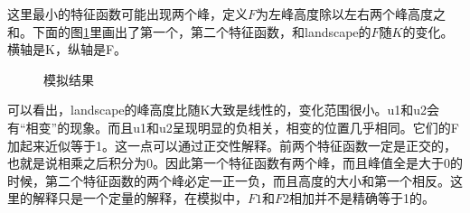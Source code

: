 \documentclass[12pt,a4paper]{article}
\begin{document}
这里最小的特征函数可能出现两个峰，定义$F$为左峰高度除以左右两个峰高度之和。下面的图\ref{f4}里画出了第一个，第二个特征函数，和landscape的$F$随$K$的变化。横轴是K，纵轴是F。
\begin{figure}[h]
\centering
{}
\caption{模拟结果}
\label{f4}
\end{figure}

可以看出，landscape的峰高度比随K大致是线性的，变化范围很小。u1和u2会有“相变”的现象。而且u1和u2呈现明显的负相关，相变的位置几乎相同。它们的F加起来近似等于1。这一点可以通过正交性解释。前两个特征函数一定是正交的，也就是说相乘之后积分为0。因此第一个特征函数有两个峰，而且峰值全是大于0的时候，第二个特征函数的两个峰必定一正一负，而且高度的大小和第一个相反。这里的解释只是一个定量的解释，在模拟中，$F1$和$F2$相加并不是精确等于1的。
\end{document}

